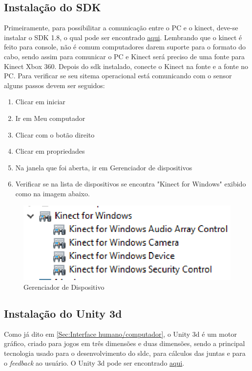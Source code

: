 \subsection{Instalação do SDK}
  Primeiramente, para possibilitar a comunicação entre o PC e o kinect, deve-se
instalar o SDK 1.8, o qual pode ser encontrado \href{https://www.microsoft.com/en-us/download/details.aspx?id=40278}{aqui}.
  Lembrando que o kinect é feito para console, não é comum computadores darem suporte para o formato do
cabo, sendo assim para comunicar o PC e Kinect será preciso de uma fonte para Kinect Xbox 360.
  Depois do sdk instalado, conecte o Kinect na fonte e a fonte no PC. Para verificar se seu sitema operacional
está comunicando com o sensor alguns passos devem ser seguidos:

\begin{enumerate}
  \item Clicar em iniciar
  \item Ir em Meu computador
  \item Clicar com o botão direito
  \item Clicar em propriedades
  \item Na janela que foi aberta, ir em Gerenciador de dispositivos
  \item Verificar se na lista de dispositivos se encontra "Kinect for Windows" exibido como na imagem abaixo.
\end{enumerate}


\begin{figure}[!h]
\centering
\includegraphics [keepaspectratio=true,scale=0.60]{figuras/gerenciadorDispositivo.eps}

\caption{Gerenciador de Dispositivo}
\label{gerenciadorDispositivo}
\end{figure}

\subsection{Instalação do Unity 3d}\label{sub:instalacaoUnity}
  Como já dito em \ref{Sec:Interface humano/computador}, o Unity 3d é um motor gráfico, criado para jogos em três dimensões e duas dimensões,
sendo a principal tecnologia usado para o desenvolvimento do sldc, para cálculos das juntas e para o \textit{feedback} ao usuário.
O Unity 3d pode ser encontrado \href{https://unity3d.com/pt/get-unity/download}{aqui}.

